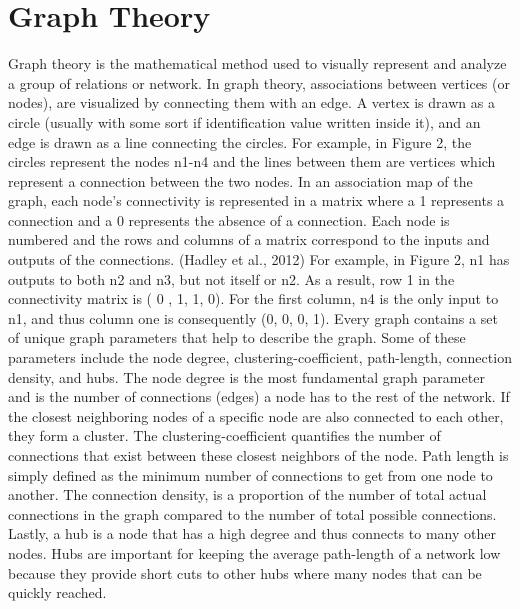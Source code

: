 \documentclass[12pt,letterpaper]{report}
\begin{document}
\section{Graph Theory}
        Graph theory is the mathematical method used to visually represent and analyze a group of relations or network. In graph theory, associations between vertices (or nodes), are visualized by connecting them with an edge. A vertex is drawn as a circle (usually with some sort if identification value written inside it), and an edge is drawn as a line connecting the circles. For example, in Figure 2, the circles represent the nodes n1-n4 and the lines between them are vertices which represent a connection between the two nodes.
        In an association map of the graph­, each node’s connectivity is represented in a matrix where a 1 represents a connection and a 0 represents the absence of a connection. Each node is numbered and the rows and columns of a matrix correspond to the inputs and outputs of the connections. (Hadley et al., 2012) For example, in Figure 2, n1 has outputs to both n2 and n3, but not itself or n2. As a result, row 1 in the connectivity matrix is ( 0 , 1, 1, 0). For the first column, n4 is the only input to n1, and thus column one is consequently (0, 0, 0, 1). 
        Every graph contains a set of unique graph parameters that help to describe the graph. Some of these parameters include the node degree, clustering-coefficient, path-length, connection  density, and hubs. The node degree is the most fundamental graph parameter and is the number of connections (edges)  a node has to the rest of the network. If the closest neighboring nodes of a specific node are also connected to each other, they form a cluster. The clustering-coefficient quantifies the number of connections that exist between these closest neighbors of the node. Path length is simply defined as the minimum number of connections to get from one node to another. The connection density, is a proportion of the number of total actual connections in the graph compared to the number of total possible connections. Lastly, a hub is a node that has a high degree and thus connects to many other nodes. Hubs are important for keeping the average path-length of a network low because they provide short cuts to other hubs where many nodes that can be quickly reached.
\end{document}
